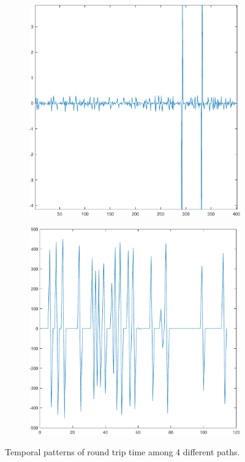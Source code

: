\documentclass[sigconf]{acmart}
\begin{document}
\begin{figure}[!htp]
\begin{subfigure}[t]{0.4\linewidth}
			\label{fig:3.3b}
		\end{subfigure}
		\begin{subfigure}[t]{0.4\linewidth}
			\centering
			\includegraphics[width=0.95\linewidth, trim={100 100 0 0}, clip=true]{fig/RTT_21}
			\label{fig:3.3c}
		\end{subfigure}
		\begin{subfigure}[t]{0.4\linewidth}
			\centering
			\includegraphics[width=0.95\linewidth, trim={100 100 0 0}, clip]{fig/RTT_30}
			\label{fig:3.3d}
		\end{subfigure}
		\caption{Temporal patterns of round trip time among 4 different paths.}
		\label{fig:3.3}
	\end{figure}
	
\end{document}
